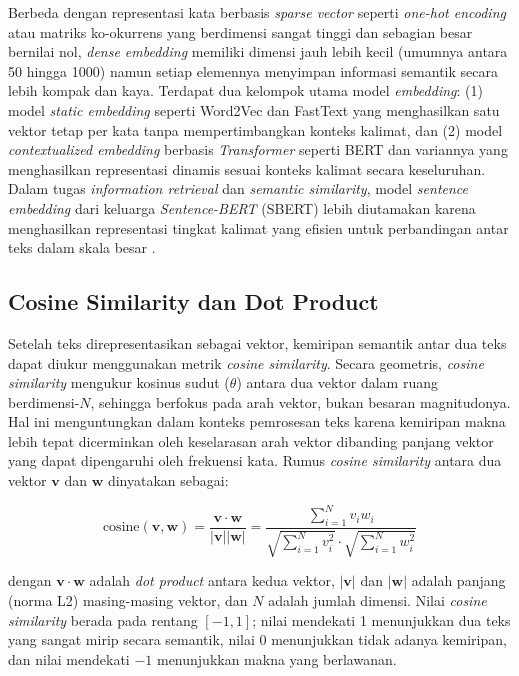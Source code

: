 Berbeda dengan representasi kata berbasis \textit{sparse vector} seperti \textit{one-hot encoding} atau matriks ko-okurrens yang berdimensi sangat tinggi dan sebagian besar bernilai nol, \textit{dense embedding} memiliki dimensi jauh lebih kecil (umumnya antara 50 hingga 1000) namun setiap elemennya menyimpan informasi semantik secara lebih kompak dan kaya. Terdapat dua kelompok utama model \textit{embedding}: (1) model \textit{static embedding} seperti Word2Vec dan FastText yang menghasilkan satu vektor tetap per kata tanpa mempertimbangkan konteks kalimat, dan (2) model \textit{contextualized embedding} berbasis \textit{Transformer} seperti BERT dan variannya yang menghasilkan representasi dinamis sesuai konteks kalimat secara keseluruhan. Dalam tugas \textit{information retrieval} dan \textit{semantic similarity}, model \textit{sentence embedding} dari keluarga \textit{Sentence-BERT} (SBERT) lebih diutamakan karena menghasilkan representasi tingkat kalimat yang efisien untuk perbandingan antar teks dalam skala besar \cite{jurafsky2026slp}.

\subsection{Cosine Similarity dan Dot Product}

Setelah teks direpresentasikan sebagai vektor, kemiripan semantik antar dua teks dapat diukur menggunakan metrik \textit{cosine similarity}. Secara geometris, \textit{cosine similarity} mengukur kosinus sudut ($\theta$) antara dua vektor dalam ruang berdimensi-$N$, sehingga berfokus pada arah vektor, bukan besaran magnitudonya. Hal ini menguntungkan dalam konteks pemrosesan teks karena kemiripan makna lebih tepat dicerminkan oleh keselarasan arah vektor dibanding panjang vektor yang dapat dipengaruhi oleh frekuensi kata. Rumus \textit{cosine similarity} antara dua vektor $\mathbf{v}$ dan $\mathbf{w}$ dinyatakan sebagai:

\begin{equation}
	\text{cosine}(\mathbf{v}, \mathbf{w}) = \frac{\mathbf{v} \cdot \mathbf{w}}{|\mathbf{v}||\mathbf{w}|} = \frac{\displaystyle\sum_{i=1}^{N} v_i w_i}{\sqrt{\displaystyle\sum_{i=1}^{N} v_i^2} \cdot \sqrt{\displaystyle\sum_{i=1}^{N} w_i^2}}
	\label{eq:cosine}
\end{equation}

dengan $\mathbf{v} \cdot \mathbf{w}$ adalah \textit{dot product} antara kedua vektor, $|\mathbf{v}|$ dan $|\mathbf{w}|$ adalah panjang (norma L2) masing-masing vektor, dan $N$ adalah jumlah dimensi. Nilai \textit{cosine similarity} berada pada rentang $[-1, 1]$; nilai mendekati 1 menunjukkan dua teks yang sangat mirip secara semantik, nilai 0 menunjukkan tidak adanya kemiripan, dan nilai mendekati $-1$ menunjukkan makna yang berlawanan.

